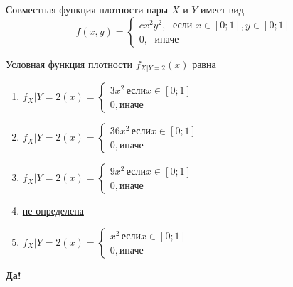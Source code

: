 \documentclass[t]{beamer}
\begin{document}
 \begin{frame} \label{22-Yes} 
\begin{block}{22} 

Совместная функция плотности пары $X$ и $Y$ имеет вид
\[
f(x,y)=\begin{cases}
cx^2y^2, \; \text{ если } x\in[0;1], y\in [0;1] \\
0, \; \text{ иначе}
\end{cases}
\]

\vspace{0.5cm} 
 
 
Условная функция плотности  $f_{X|Y=2}(x)$ равна
 


 \end{block} 
\begin{enumerate} 
\item[] \hyperlink{22-No}{\beamergotobutton{} $f_X|Y=2(x)=\begin{cases} 3x^2\, \text{если}  x\in [0;1] \\ 0, \text{иначе}     \end{cases}$}
\item[] \hyperlink{22-No}{\beamergotobutton{} $f_X|Y=2(x)=\begin{cases} 36x^2\, \text{если}  x\in [0;1] \\ 0, \text{иначе}     \end{cases}$}
\item[] \hyperlink{22-No}{\beamergotobutton{} $f_X|Y=2(x)=\begin{cases} 9x^2\, \text{если}  x\in [0;1] \\ 0, \text{иначе}     \end{cases}$}
\item[] \hyperlink{22-Yes}{\beamergotobutton{} не определена}
\item[] \hyperlink{22-No}{\beamergotobutton{} $f_X|Y=2(x)=\begin{cases} x^2\, \text{если}  x\in [0;1] \\ 0, \text{иначе}     \end{cases}$}
\end{enumerate} 

 \textbf{Да!} 
 \hyperlink{23}{}\end{frame} 
\end{document}
